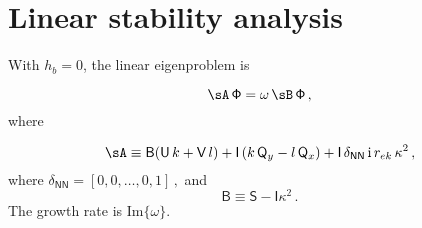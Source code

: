 \documentclass[11pt]{article}
\begin{document}


\section*{Linear stability analysis}

With $h_b = 0$, the linear eigenproblem is

\begin{equation}
 \sA \, \mathsf{\Phi} = \omega \, \sB\, \mathsf{\Phi}\,,
\end{equation}
where

\begin{equation}
\sA \equiv \mathsf{B}(\mathsf{U}\, k + \mathsf{V}\,l) + \mathsf{I}\left(k\,\mathsf{Q}_y - l\,\mathsf{Q}_x\right) + \mathsf{I}\,\delta_{\mathsf{N}\mathsf{N}}\, \mathrm{i} \,r_{ek}\,\kappa^2\,,
\end{equation}
where $\delta_{\mathsf{N}\mathsf{N}} = [0,0,\dots,0,1]\,,$
and 
\begin{equation}
\mathsf{B} \equiv  \mathsf{S} - \mathsf{I} \kappa^2\,. 
\end{equation}
The growth rate is Im$\{\omega\}$.
\end{document}
